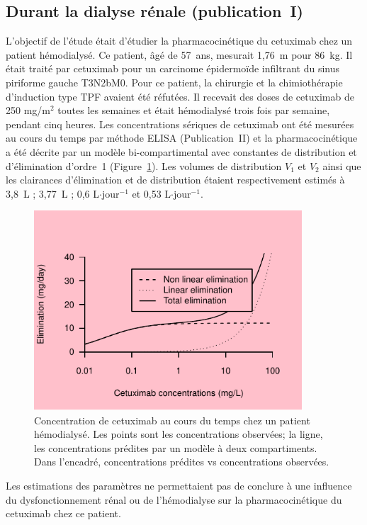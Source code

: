 \subsection{Durant la dialyse rénale (publication~I)}
L'objectif de l'étude était d'étudier la pharmacocinétique du cetuximab chez un patient hémodialysé. Ce patient, âgé de 57~ans, mesurait 1,76~m pour 86~kg. Il était traité par cetuximab pour un carcinome épidermoïde infiltrant du sinus piriforme gauche T3N2bM0. Pour ce patient, la chirurgie et la chimiothérapie d'induction type TPF avaient été réfutées. Il recevait des doses de cetuximab de 250 mg/m$^2$ toutes les semaines et était hémodialysé trois fois par semaine, pendant cinq heures. Les concentrations sériques de cetuximab ont été mesurées au cours du temps par méthode ELISA (Publication~II) et la pharmacocinétique a été décrite par un modèle bi-compartimental avec constantes de distribution et d'élimination d'ordre~1 (Figure~\ref{fig:18}). Les volumes de distribution $V_1$ et $V_2$ ainsi que les clairances d'élimination et de distribution étaient respectivement estimés à 3,8~L ; 3,77~L ; 0,6 L$\cdot$jour$^{-1}$ et 0,53 L$\cdot$jour$^{-1}$. 
\begin{figure}[htbp]
	\centering
		\includegraphics[width=10cm]{images/essai001.pdf}
	\caption[Concentration de cetuximab au cours du temps chez un patient hémodialysé.]{Concentration de cetuximab au cours du temps chez un patient hémodialysé. Les points sont les concentrations observées; la ligne, les concentrations prédites par un modèle à deux compartiments. Dans l'encadré, concentrations prédites vs concentrations observées.}
	\label{fig:18}
\end{figure}

Les estimations des paramètres ne permettaient pas de conclure à une influence du dysfonctionnement rénal ou de l'hémodialyse sur la pharmacocinétique du cetuximab chez ce patient. 
